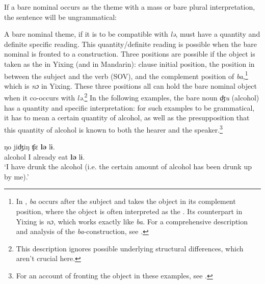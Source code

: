 \documentclass[output=paper]{langsci/langscibook}
\begin{document}
If a bare nominal occurs as the theme with a mass or bare plural
interpretation, the sentence will be ungrammatical:

\begin{exe}
\ex {} \begin{xlist}

\end{xlist}
\end{exe}

A bare nominal theme, if it is to be compatible with \emph{lə}, must have a quantity
and definite specific reading. This quantity/definite reading is possible when
the bare nominal is fronted to a  construction. Three positions are
possible if the object is taken as the  in Yixing (and in Mandarin):
clause initial position, the position in between the subject and the verb
(SOV), and the complement position of \emph{ba},\footnote{In , \emph{ba}
occurs after the subject and takes the object in its complement position,
where the object is often interpreted as the . Its counterpart in Yixing is
\emph{nɔ}, which works exactly like \emph{ba}. For a comprehensive description
and analysis of the \emph{ba}-construction, see
\textcite[153--196]{HuangEtal2009}.} which is \emph{nɔ} in Yixing. These three
positions all can hold the bare nominal object when it co-occurs with
\emph{lə}.\footnote{This description ignores possible underlying structural
    differences, which aren’t crucial here.} In the following examples, the
    bare noun \emph{ʤu} (alcohol) has a quantity and specific interpretation:
    for such examples to be grammatical, it has to mean a certain quantity of
    alcohol, as well as the presupposition that this quantity of alcohol is
    known to both the hearer and the speaker.\footnote{For an account of
    fronting the object in these examples, see
\textcite{Huxuhui2016}.}

\begin{exe}
    \ex {}
    \sn {} ŋo {jiʤiŋ} {ʧε} \textbf{lə} lɨ. \\
    alcohol I already eat \textbf{lə} lɨ. \\
    \glt \enquote*{I have drunk the alcohol (i.e. the certain amount of alcohol has been drunk up by me).}
\end{exe}
\end{document}
